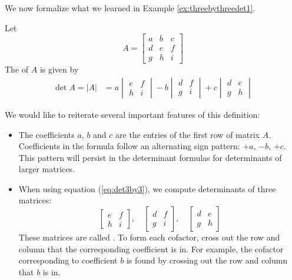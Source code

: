 \documentclass{ximera}
\begin{document}
We now formalize what we learned in Example \ref{ex:threebythreedet1}.
\begin{definition}\label{def:threebythreedet}
Let
$$A=\begin{bmatrix}a&b&c\\d&e&f\\g&h&i\end{bmatrix}$$
The  of $A$ is given by
\begin{align}\label{eq:det3by3}
\det{A}=|A|&=a\begin{vmatrix}e&f\\h&i\end{vmatrix}-b\begin{vmatrix}d&f\\g&i\end{vmatrix}+c\begin{vmatrix}d&e\\g&h\end{vmatrix}
\end{align}
\end{definition}

We would like to reiterate several important features of this definition:
\begin{itemize}
\item The coefficients $a$, $b$ and $c$ are the entries of the first row of matrix $A$.  Coefficients in the formula follow an alternating sign pattern: $+a$, $-b$, $+c$.  This pattern will persist in the determinant formulas for determinants of larger matrices.
\item When using equation (\ref{eq:det3by3}), we compute determinants of three matrices:
$$\begin{bmatrix}e&f\\h&i\end{bmatrix},\quad \begin{bmatrix}d&f\\g&i\end{bmatrix},\quad \begin{bmatrix}d&e\\g&h\end{bmatrix}$$
These matrices are called .  To form each cofactor,
cross out the row and column that the corresponding coefficient is in.  For example, the cofactor corresponding to coefficient $b$ is found by crossing out the row and column that $b$ is in.
\begin{center}
 \end{center} 
\end{itemize}
\end{document}

